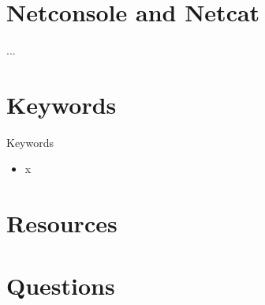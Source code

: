 \documentclass{workshop}
\begin{document}
\section{Netconsole and Netcat}
\begin{frame}{...}
\end{frame}

\section{Keywords}
\begin{frame}{Keywords}
      \begin{itemize}
        \item x
      \end{itemize}
\end{frame}

\section{Resources}

\section{Questions}
\end{document}

